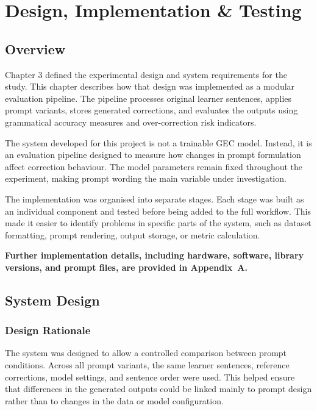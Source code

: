 \chapter{Design, Implementation \& Testing}

\section{Overview}

Chapter 3 defined the experimental design and system requirements for the study. This chapter describes how that design was implemented as a modular evaluation pipeline. The pipeline processes original learner sentences, applies prompt variants, stores generated corrections, and evaluates the outputs using grammatical accuracy measures and over-correction risk indicators.

The system developed for this project is not a trainable GEC model. Instead, it is an evaluation pipeline designed to measure how changes in prompt formulation affect correction behaviour. The model parameters remain fixed throughout the experiment, making prompt wording the main variable under investigation.

The implementation was organised into separate stages. Each stage was built as an individual component and tested before being added to the full workflow. This made it easier to identify problems in specific parts of the system, such as dataset formatting, prompt rendering, output storage, or metric calculation.

\textbf{Further implementation details, including hardware, software, library versions, and prompt files, are provided in Appendix~A.}

\section{System Design}

\subsection{Design Rationale}

The system was designed to allow a controlled comparison between prompt conditions. Across all prompt variants, the same learner sentences, reference corrections, model settings, and sentence order were used. This helped ensure that differences in the generated outputs could be linked mainly to prompt design rather than to changes in the data or model configuration.

